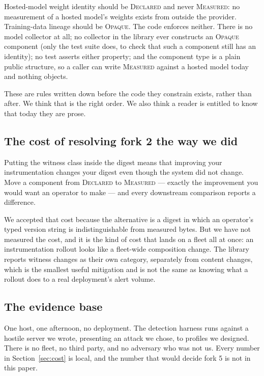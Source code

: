 \documentclass[11pt]{article}
\begin{document}
Hosted-model weight identity should be \textsc{Declared} and never
\textsc{Measured}: no measurement of a hosted model's weights exists from
outside the provider. Training-data lineage should be \textsc{Opaque}. The
code enforces neither. There is no model collector at all; no collector in the
library ever constructs an \textsc{Opaque} component (only the test suite
does, to check that such a component still has an identity); no test asserts
either property; and the component type is a plain public structure, so a
caller can write \textsc{Measured} against a hosted model today and nothing
objects.

These are rules written down before the code they constrain exists, rather
than after. We think that is the right order. We also think a reader is
entitled to know that today they are prose.

\subsection{The cost of resolving fork 2 the way we did}

Putting the witness class inside the digest means that improving your
instrumentation changes your digest even though the system did not change.
Move a component from \textsc{Declared} to \textsc{Measured} --- exactly the
improvement you would want an operator to make --- and every downstream
comparison reports a difference.

We accepted that cost because the alternative is a digest in which an
operator's typed version string is indistinguishable from measured bytes. But
we have not measured the cost, and it is the kind of cost that lands on a
fleet all at once: an instrumentation rollout looks like a fleet-wide
composition change. The library reports witness changes as their own category,
separately from content changes, which is the smallest useful mitigation and
is not the same as knowing what a rollout does to a real deployment's alert
volume.

\subsection{The evidence base}

One host, one afternoon, no deployment. The detection harness runs against a
hostile server we wrote, presenting an attack we chose, to profiles we
designed. There is no fleet, no third party, and no adversary who was not us.
Every number in Section~\ref{sec:cost} is local, and the number that would
decide fork 5 is not in this paper.
\end{document}
